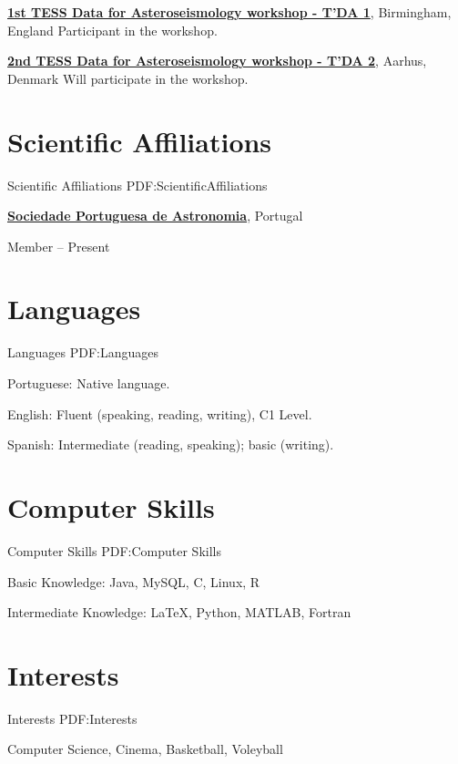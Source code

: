 \documentclass[letterpaper,10pt,oneside]{article}
\begin{document}
\begin{body}
\GapNoBreak
\href{http://sac.au.dk/currently/tess-data-for-asteroseismology-workshop/}
{\textbf{1st TESS Data for Asteroseismology workshop - T'DA 1}},
Birmingham, England
\hfill
{}
\GapNoBreak
\BulletItem
Participant in the workshop.

\GapNoBreak
\href{http://sac.au.dk/currently/2nd-tess-data-for-asteroseismology-workshop/}
{\textbf{2nd TESS Data for Asteroseismology workshop - T'DA 2}},
Aarhus, Denmark
\hfill
{}
\GapNoBreak
\BulletItem
Will participate in the workshop.



\section
{Scientific Affiliations}
{Scientific Affiliations}
{PDF:ScientificAffiliations}

\href{http://www.sp-astronomia.pt/}
{\textbf{Sociedade Portuguesa de Astronomia}},
Portugal

\GapNoBreak
\BulletItem
Member
\hfill
{} --
Present


\section
{Languages}
{Languages}
{PDF:Languages}

\BulletItem
Portuguese: Native language.

\GapNoBreak
\BulletItem
English: Fluent (speaking, reading, writing), C1 Level.

\GapNoBreak
\BulletItem
Spanish: Intermediate (reading, speaking); basic (writing).


\section
{Computer Skills}
{Computer Skills}
{PDF:Computer Skills}

\BulletItem
Basic Knowledge: Java, MySQL, C, Linux, R

\GapNoBreak
\BulletItem
Intermediate Knowledge: {\LaTeX}, Python, MATLAB, Fortran


\section
{Interests}
{Interests}
{PDF:Interests}

Computer Science, Cinema, Basketball, Voleyball
\end{body}
\label{LastPage}~
\end{document}
